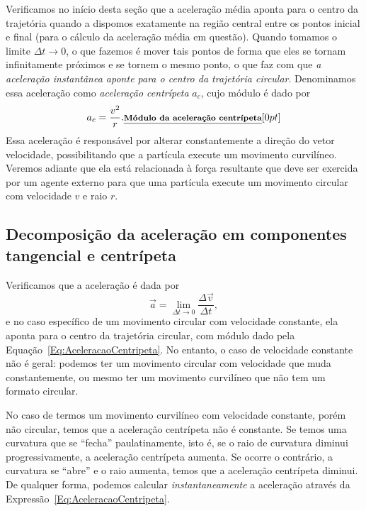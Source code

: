 Verificamos no início desta seção que a aceleração média aponta para o centro da trajetória quando a dispomos exatamente na região central entre os pontos inicial e final (para o cálculo da aceleração média em questão). Quando tomamos o limite $\Delta t \to 0$, o que fazemos é mover tais pontos de forma que eles se tornam infinitamente próximos e se tornem o mesmo ponto, o que faz com que \emph{a aceleração instantânea aponte para o centro da trajetória circular}. Denominamos essa aceleração como \emph{aceleração centrípeta} $a_c$, cujo módulo é dado por
\begin{equation}\label{Eq:AceleracaoCentripeta}
  a_c = \frac{v^2}{r}. \relax{\footnotesize\emph{\textbf{Módulo da aceleração centrípeta}}}[0pt]
\end{equation}
%
Essa aceleração é responsável por alterar constantemente a direção do vetor velocidade, possibilitando que a partícula execute um movimento curvilíneo. Veremos adiante que ela está relacionada à força resultante que deve ser exercida por um agente externo para que uma partícula execute um movimento circular com velocidade $v$ e raio $r$.

\subsection{Decomposição da aceleração em componentes tangencial e centrípeta}

Verificamos que a aceleração é dada por
\begin{displaymath}
  \vec{a} = \lim_{\Delta t \to 0} \frac{\Delta \vec{v}}{\Delta t},
\end{displaymath}
%
e no caso específico de um movimento circular com velocidade constante, ela aponta para o centro da trajetória circular, com módulo dado pela Equação~\eqref{Eq:AceleracaoCentripeta}. No entanto, o caso de velocidade constante não é geral: podemos ter um movimento circular com velocidade que muda constantemente, ou mesmo ter um movimento curvilíneo que não tem um formato circular.

No caso de termos um movimento curvilíneo com velocidade constante, porém não circular, temos que a aceleração centrípeta não é constante. Se temos uma curvatura que se ``fecha'' paulatinamente, isto é, se o raio de curvatura diminui progressivamente, a aceleração centrípeta aumenta. Se ocorre o contrário, a curvatura se ``abre'' e o raio aumenta, temos que a aceleração centrípeta diminui. De qualquer forma, podemos calcular \emph{instantaneamente} a aceleração através da Expressão~\ref{Eq:AceleracaoCentripeta}.


